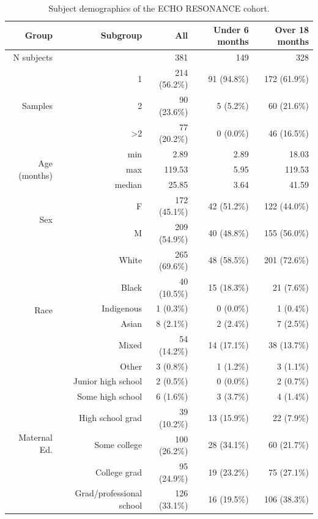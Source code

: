 \documentclass{article}
\begin{document}
\begin{table}[!h]
    \centering
    \begin{tabular}{|r|r|r|r|r|}
      \hline\hline
      \textbf{Group} & \textbf{Subgroup} & \textbf{All} & \textbf{Under 6 months} & \textbf{Over 18 months} \\\hline
      N subjects &  & 381 & 149 & 328 \\  \hline
    \multirow{3}{*}{Samples} & 1 & 214 (56.2\%) & 91 (94.8\%) & 172 (61.9\%) \\ \cline{2-5}
         & 2 & 90 (23.6\%) & 5 (5.2\%) & 60 (21.6\%) \\ \cline{2-5}
         & \textgreater 2 & 77 (20.2\%) & 0 (0.0\%) & 46 (16.5\%) \\ \hline
    \multirow{3}{*}{Age (months)} & min & 2.89 & 2.89 & 18.03 \\ \cline{2-5}
         & max & 119.53 & 5.95 & 119.53 \\ \cline{2-5}
         & median & 25.85 & 3.64 & 41.59 \\ \hline
    \multirow{2}{*}{Sex} & F & 172 (45.1\%) & 42 (51.2\%) & 122 (44.0\%) \\   \cline{2-5}
                         & M & 209 (54.9\%) & 40 (48.8\%) & 155 (56.0\%) \\  \hline
    \multirow{6}{*}{Race} & White & 265 (69.6\%) & 48 (58.5\%) & 201 (72.6\%) \\   \cline{2-5}
        & Black & 40 (10.5\%) & 15 (18.3\%) & 21 (7.6\%) \\ \cline{2-5}
        & Indigenous & 1 (0.3\%) & 0 (0.0\%) & 1 (0.4\%) \\ \cline{2-5}
        & Asian & 8 (2.1\%) & 2 (2.4\%) & 7 (2.5\%) \\ \cline{2-5}
        & Mixed & 54 (14.2\%) & 14 (17.1\%) & 38 (13.7\%) \\ \cline{2-5}
        & Other & 3 (0.8\%) & 1 (1.2\%) & 3 (1.1\%) \\ \hline
    \multirow{6}{*}{Maternal Ed.} & Junior high school & 2 (0.5\%) & 0 (0.0\%) & 2 (0.7\%) \\   \cline{2-5}
        & Some high school & 6 (1.6\%) & 3 (3.7\%) & 4 (1.4\%) \\ \cline{2-5}
        & High school grad & 39 (10.2\%) & 13 (15.9\%) & 22 (7.9\%) \\ \cline{2-5}
        & Some college & 100 (26.2\%) & 28 (34.1\%) & 60 (21.7\%) \\ \cline{2-5}
        & College grad & 95 (24.9\%) & 19 (23.2\%) & 75 (27.1\%) \\ \cline{2-5}
        & Grad/professional school & 126 (33.1\%) & 16 (19.5\%) & 106 (38.3\%) \\\hline\hline
    \end{tabular}
    \caption{\label{tab:demo}Subject demographics of the ECHO RESONANCE cohort.}
\end{table}
\end{document}
